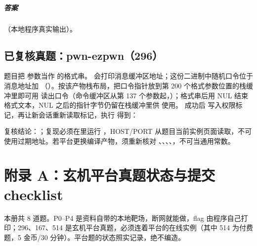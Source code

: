 \documentclass[UTF8,12pt,oneside]{ctexbook}
\begin{document}
\paragraph{答案}（本地程序真实输出）。

\section{已复核真题：pwn-ezpwn（296）}
题目把  参数当作  的格式串。 会打印消息缓冲区地址；这份二进制中随机口令位于消息地址加 （）。按该产物栈布局，把口令指针放到第 200 个格式参数位置的栈缓冲里即可用  读出口令（命令缓冲区从第 137 个参数起，）；格式串后用 NUL 结束格式文本，NUL 之后的指针字节仍留在栈缓冲里供  使用。 成功后  写入权限标记，再让新会话重新读取标记，执行  得到：


复核结论：；复现必须在里运行 ，HOST/PORT 从题目当前实例页面读取，不可使用过期地址。若平台更换编译产物，须重新核对 、、、、，不可当通用常数。

\chapter*{附录 A：玄机平台真题状态与提交 checklist}
本册共 8 道题。P0--P4 是资料自带的本地靶场，断网就能做，flag 由程序自己打印；296、167、514 是玄机平台真题，必须连着平台的在线实例（其中 514 为付费题，5 金币/30 分钟）。平台题的状态照实记录，绝不编造。
\end{document}
